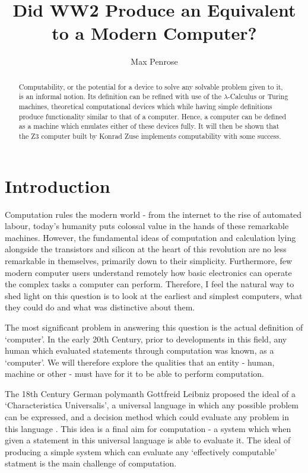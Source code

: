 \documentclass {article}
\title{Did WW2 Produce an Equivalent to a Modern Computer?}
\author{Max Penrose}
\begin{document}
\maketitle
\medskip

\begin{abstract}
Computability, or the potential for a device to solve any solvable problem given to it, is an informal notion. Its definition can be refined with use of the $\lambda$-Calculus or Turing machines, theoretical computational devices which while having simple definitions produce functionality similar to that of a computer. Hence, a computer can be defined as a machine which emulates either of these devices fully. It will then be shown that the Z3 computer built by Konrad Zuse implements computability with some success.
\end{abstract}

\section*{Introduction}
Computation rules the modern world - from the internet to the rise of automated labour, today's humanity puts colossal value in the hands of these remarkable machines. However, the fundamental ideas of computation and calculation lying alongside the transistors and silicon at the heart of this revolution are no less remarkable in themselves, primarily down to their simplicity. Furthermore, few modern computer users understand remotely how basic electronics can operate the complex tasks a computer can perform. Therefore, I feel the natural way to shed light on this question is to look at the earliest and simplest computers, what they could do and what was distinctive about them.

The most significant problem in answering this question is the actual definition of `computer'. In the early 20th Century, prior to developments in this field, any human which evaluated statements through computation was known, as a `computer'. We will therefore explore the qualities that an entity - human, machine or other - must have for it to be able to perform computation.

The 18th Century German polymanth Gottfreid Leibniz proposed the ideal of a `Characteristica Universalis', a universal language in which any possible problem can be expressed, and a decision method which could evaluate any problem in this language \cite{barendregt1984introduction}. This idea is a final aim for computation - a system which when given a statement in this universal language is able to evaluate it. The ideal of producing a simple system which can evaluate any `effectively computable' statment is the main challenge of computation.
\end{document}
